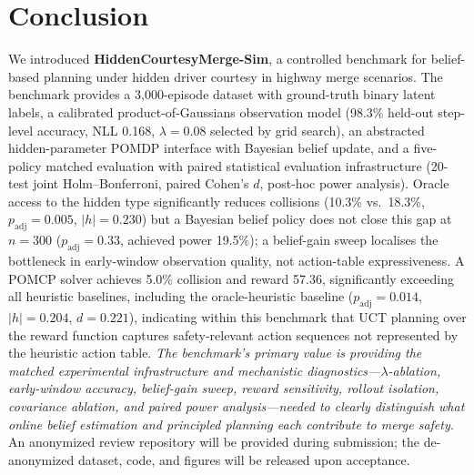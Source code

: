 \section{Conclusion}
\label{sec:conclusion}

We introduced \textbf{HiddenCourtesyMerge-Sim}, a controlled benchmark for
belief-based planning under hidden driver courtesy in highway merge scenarios.
The benchmark provides a 3{,}000-episode dataset with ground-truth binary
latent labels, a calibrated product-of-Gaussians observation model
(98.3\% held-out step-level accuracy, NLL 0.168, $\lambda{=}0.08$ selected
by grid search), an abstracted hidden-parameter POMDP interface with Bayesian
belief update, and a five-policy matched evaluation with paired statistical
evaluation infrastructure
(20-test joint Holm--Bonferroni, paired Cohen's $d$, post-hoc power analysis).
Oracle access to the hidden type significantly reduces collisions
(10.3\% vs.\ 18.3\%, $p_\text{adj}{=}0.005$, $|h|{=}0.230$) but a Bayesian
belief policy does not close this gap at $n{=}300$ ($p_\text{adj}{=}0.33$,
achieved power 19.5\%); a belief-gain sweep localises the bottleneck in
early-window observation quality, not action-table expressiveness.
A POMCP solver achieves 5.0\% collision and reward 57.36, significantly
exceeding all heuristic baselines, including the oracle-heuristic baseline
($p_\text{adj}{=}0.014$, $|h|{=}0.204$, $d{=}0.221$), indicating within this
benchmark that UCT planning over the reward function captures
safety-relevant action sequences not represented by the heuristic action table.
\textit{The benchmark's primary value is providing the matched experimental
infrastructure and mechanistic diagnostics---$\lambda$-ablation,
early-window accuracy, belief-gain sweep, reward sensitivity, rollout
isolation, covariance ablation, and paired power analysis---needed to clearly
distinguish what online belief estimation and principled planning each
contribute to merge safety.}
An anonymized review repository will be provided during submission; the
de-anonymized dataset, code, and figures will be released upon acceptance.
